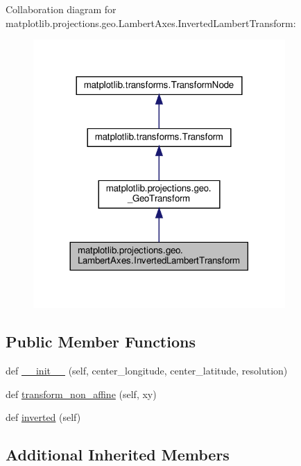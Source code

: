 Collaboration diagram for matplotlib.\+projections.\+geo.\+Lambert\+Axes.\+Inverted\+Lambert\+Transform\+:
\nopagebreak
\begin{figure}[H]
\begin{center}
\leavevmode
\includegraphics[width=272pt]{classmatplotlib_1_1projections_1_1geo_1_1LambertAxes_1_1InvertedLambertTransform__coll__graph}
\end{center}
\end{figure}
\subsection*{Public Member Functions}
\begin{DoxyCompactItemize}
\item 
def \hyperlink{classmatplotlib_1_1projections_1_1geo_1_1LambertAxes_1_1InvertedLambertTransform_ab47fcb8c6dda7553d6b23256971e0a15}{\+\_\+\+\_\+init\+\_\+\+\_\+} (self, center\+\_\+longitude, center\+\_\+latitude, resolution)
\item 
def \hyperlink{classmatplotlib_1_1projections_1_1geo_1_1LambertAxes_1_1InvertedLambertTransform_a39e25eb054a94af25b9bf4b77acecfae}{transform\+\_\+non\+\_\+affine} (self, xy)
\item 
def \hyperlink{classmatplotlib_1_1projections_1_1geo_1_1LambertAxes_1_1InvertedLambertTransform_acf5bea4dbdaaa90b459148abdfb3ccf9}{inverted} (self)
\end{DoxyCompactItemize}
\subsection*{Additional Inherited Members}


